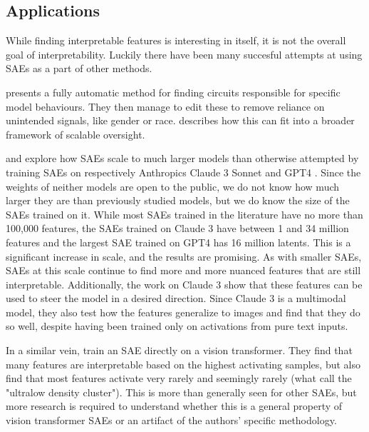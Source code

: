
\subsection{Applications}
\label{sec:applications}
While finding interpretable features is interesting in itself, it is not the overall goal of interpretability.
Luckily there have been many succesful attempts at using SAEs as a part of other methods.

\textcite{marks_sparse_2024} presents a fully automatic method for finding circuits \parencite{elhage_mathematical_2021} responsible for specific model behaviours.
They then manage to edit these to remove reliance on unintended signals, like gender or race.
\textcite{marks_discriminating_2024} describes how this can fit into a broader framework of scalable oversight.

\textcite{templeton_scaling_2024} and \textcite{gao_scaling_2024} explore how SAEs scale to much larger models than otherwise attempted by training SAEs on respectively Anthropics Claude 3 Sonnet \parencite{anthropic_introducing_2024} and GPT4 \parencite{openai_gpt-4_2024}.
Since the weights of neither models are open to the public, we do not know how much larger they are than previously studied models, but we do know the size of the SAEs trained on it.
While most SAEs trained in the literature have no more than 100,000 features, the SAEs trained on Claude 3 have between 1 and 34 million features and the largest SAE trained on GPT4 has 16 million latents.
This is a significant increase in scale, and the results are promising.
As with smaller SAEs, SAEs at this scale continue to find more and more nuanced features that are still interpretable.
Additionally, the work on Claude 3 show that these features can be used to steer the model in a desired direction.
Since Claude 3 is a multimodal model, they also test how the features generalize to images and find that they do so well, despite having been trained only on activations from pure text inputs.

In a similar vein, \textcite{fry_towards_2024} train an SAE directly on a vision transformer.
They find that many features are interpretable based on the highest activating samples, but also find that most features activate very rarely and seemingly rarely (what \textcite{bricken_towards_2023} call the "ultralow density cluster").
This is more than generally seen for other SAEs, but more research is required to understand whether this is a general property of vision transformer SAEs or an artifact of the authors' specific methodology.

